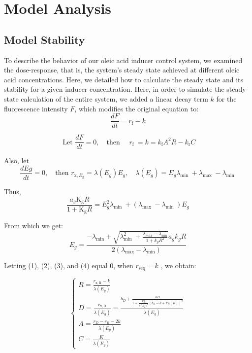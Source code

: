 \documentclass[UTF8]{article}
\begin{document}
\section{Model Analysis}

\subsection{Model Stability}
To describe the behavior of our oleic acid inducer control system, we  examined the dose-response, that is, the system's steady state achieved  at different oleic acid concentrations. Here, we detailed how to  calculate the steady state and its stability for a given inducer  concentration. Here, in order to simulate the steady-state calculation of the entire system, we added a linear decay term $k$ for the fluorescence intensity $F$, which modifies the original equation to:
\begin{equation}
	\frac{d F}{d t}=r_{\mathrm{f}}-k
\end{equation}

$$
\text { Let } \frac{d F}{d t}=0, \quad \text {then }\quad r_{\text {f }}=k=k_{\mathrm{f}} A^2 R-k_{\mathrm{r}} C
$$

Also, let $$\frac{d E g}{d t}=0, \quad \text {then }  r_{\mathrm{x}, E_{\mathrm{g}}}=\lambda(E_g) E_g, \quad \lambda(E_ g)=E_g \lambda_{\text {min }}+\lambda_{\text {max }}-\lambda_{\text {min }}$$ 

Thus,  $$\frac{a_g \mathrm{K_g} R}{1+\mathrm{K_g} R} =E_g^2 \lambda_{\text {min }}+\left(\lambda_{\text {max }}-\lambda_{\text {min }}\right) E_g$$

From which we get: 
\begin{equation}
	E_g=\frac{-\lambda _\text {min}+\sqrt{\lambda_{\text {min }}^2+\frac{\lambda_{max}-\lambda_{\min }}{1+k_g R^2}} a_g k_g R }{2\left(\lambda_{\max }-\lambda_{\min }\right)}
\end{equation}

Letting (1), (2), (3), and (4) equal 0, when $r_{\mathrm{seq}}=k$ , we obtain:

\begin{equation}
	\left\{\begin{array}{l}
		R=\frac{r_{\mathrm{x}, \mathrm{R}}-k}{\lambda\left(E_g\right)} \\
		D=\frac{r_{\mathrm{x}, \mathrm{D}}}{\lambda (E_g)}=\frac{b_D+\frac{a D}{1+\frac{K_0^2}{\lambda (E_g)^2}\left(b_R-k+P_R(R)\right)^2}}{\lambda (E_g)} \\
		A=\frac{r_D-r_B-2 k}{\lambda (E_g)} \\
		C=\frac{K}{\lambda (E_g)}
	\end{array}\right.
\end{equation}
\end{document}
